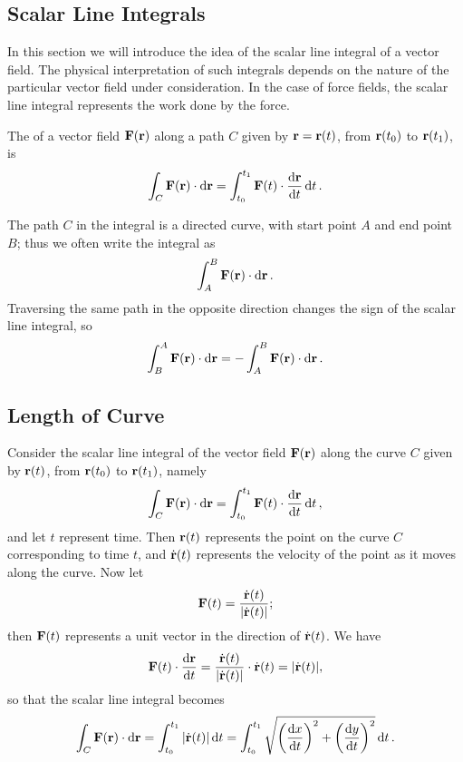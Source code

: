 \subsection{Scalar Line Integrals}
In this section we will introduce the idea of the scalar line integral of a vector field. The physical interpretation of such integrals depends on the nature of the particular vector field under consideration. In the case of force fields, the scalar line integral represents the work done by the force.

\begin{definition}
The  of a vector field $\vb{F}(\vb{r})$ along a path $C$ given by $\vb{r}=\vb{r}(t)$, from $\vb{r}(t_0)$ to $\vb{r}(t_1)$, is
\begin{equation}
\int_C\vb{F}(\vb{r})\cdot\dd{\vb{r}}=\int_{t_0}^{t_1}\vb{F}(t)\cdot\dv{\vb{r}}{t}\dd{t}.
\end{equation}
\end{definition}

The path $C$ in the integral is a directed curve, with start point $A$ and end point $B$; thus we often write the integral as
\[\int_{A}^{B}\vb{F}(\vb{r})\cdot\dd{\vb{r}}.\]
Traversing the same path in the opposite direction changes the sign of the scalar line integral, so
\[\int_{B}^{A}\vb{F}(\vb{r})\cdot\dd{\vb{r}}=-\int_{A}^{B}\vb{F}(\vb{r})\cdot\dd{\vb{r}}.\]

\subsection{Length of Curve}
Consider the scalar line integral of the vector field $\vb{F}(\vb{r})$ along the curve $C$ given by $\vb{r}(t)$, from $\vb{r}(t_0)$ to $\vb{r}(t_1)$, namely
\[\int_C\vb{F}(\vb{r})\cdot\dd{\vb{r}}=\int_{t_0}^{t_1}\vb{F}(t)\cdot\dv{\vb{r}}{t}\dd{t},\]
and let $t$ represent time. Then $\vb{r}(t)$ represents the point on the curve $C$ corresponding to time $t$, and $\dot{\vb{r}}(t)$ represents the velocity of the point as it moves along the curve. Now let
\[\vb{F}(t)=\frac{\dot{\vb{r}}(t)}{|\dot{\vb{r}}(t)|};\]
then $\vb{F}(t)$ represents a unit vector in the direction of $\dot{\vb{r}}(t)$. We have
\[\vb{F}(t)\cdot\dv{\vb{r}}{t}=\frac{\dot{\vb{r}}(t)}{|\dot{\vb{r}}(t)|}\cdot\dot{\vb{r}}(t)=|\dot{\vb{r}}(t)|,\]
so that the scalar line integral becomes
\begin{equation}
\int_C\vb{F}(\vb{r})\cdot\dd{\vb{r}}=\int_{t_0}^{t_1}|\dot{\vb{r}}(t)|\dd{t}=\int_{t_0}^{t_1}\sqrt{\left(\dv{x}{t}\right)^2+\left(\dv{y}{t}\right)^2}\dd{t}.
\end{equation}

